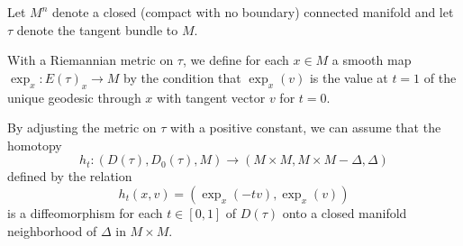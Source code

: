 Let $M^n$ denote a closed (compact with no boundary) connected manifold and let $\tau$ denote the tangent bundle to $M$.

With a Riemannian metric on $\tau$, we define for each $x \in M$ a smooth map $\exp_x: E(\tau)_x \to M$ by the condition that $\exp_x(v)$ is the value at $t = 1$ of the unique geodesic through $x$ with tangent vector $v$ for $t = 0$.

By adjusting the metric on $\tau$ with a positive constant, we can assume that the homotopy
$$h_t: (D(\tau), D_0(\tau), M) \to (M \times M, M \times M - \Delta, \Delta)$$
defined by the relation
$$h_t(x, v) = (\exp_x(-tv), \exp_x(v))$$
is a diffeomorphism for each $t \in [0, 1]$ of $D(\tau)$ onto a closed manifold neighborhood of $\Delta$ in $M \times M$.

